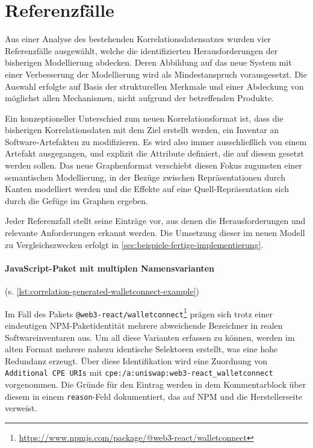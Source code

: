 \section{Referenzfälle}\label{sec:reference-case-chapter}

Aus einer Analyse des bestehenden Korrelationsdatensatzes wurden vier Referenzfälle ausgewählt, welche die identifizierten Herausforderungen der bisherigen Modellierung abdecken.
Deren Abbildung auf das neue System mit einer Verbesserung der Modellierung wird als Mindestanspruch vorausgesetzt.
Die Auswahl erfolgte auf Basis der strukturellen Merkmale und einer Abdeckung von möglichst allen Mechanismen, nicht aufgrund der betreffenden Produkte.

Ein konzeptioneller Unterschied zum neuen Korrelationsformat ist, dass die bisherigen Korrelationsdaten mit dem Ziel erstellt werden, ein Inventar an Software-Artefakten zu modifizieren.
Es wird also immer ausschließlich von einem Artefakt ausgegangen, und explizit die Attribute definiert, die auf diesem gesetzt werden sollen.
Das neue Graphenformat verschiebt diesen Fokus zugunsten einer semantischen Modellierung, in der Bezüge zwischen Repräsentationen durch Kanten modelliert werden und die Effekte auf eine Quell-Repräsentation sich durch die Gefüge im Graphen ergeben.

Jeder Referenzfall stellt seine Einträge vor, aus denen die Herausforderungen und relevante Anforderungen erkannt werden.
Die Umsetzung dieser im neuen Modell zu Vergleichszwecken erfolgt in \autoref{sec:beispiele-fertige-implementierung}.


\paragraph{JavaScript-Paket mit multiplen Namensvarianten}\label{par:reference-case-walletconnect} (s. \autoref{lst:correlation-generated-walletconnect-example})

Im Fall des Pakets \texttt{@web3-react/walletconnect}\footnote{\url{https://www.npmjs.com/package/@web3-react/walletconnect}} prägen sich trotz einer eindeutigen NPM-Paketidentität mehrere abweichende Bezeichner in realen Softwareinventaren aus.
Um all diese Varianten erfassen zu können, werden im alten Format mehrere nahezu identische Selektoren erstellt, was eine hohe Redundanz erzeugt.
Über diese Identifikation wird eine Zuordnung von \texttt{Additional CPE URIs} mit \texttt{cpe:/a:uniswap:web3-react\_walletconnect} vorgenommen.
Die Gründe für den Eintrag werden in dem Kommentarblock über diesem in einem \texttt{reason}-Feld dokumentiert, das auf NPM und die Herstellerseite verweist.

